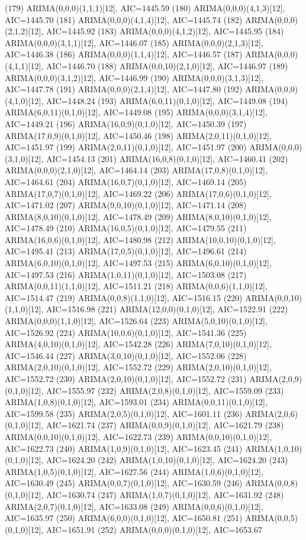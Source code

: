 \documentclass[12pt,letterpaper]{article}   %
\begin{document}
\begin{smallconsole}[caption={Modelos Ordenados por AIC}]
(179) ARIMA(0,0,0)(1,1,1)[12], AIC=1445.59
(180) ARIMA(0,0,0)(4,1,3)[12], AIC=1445.70
(181) ARIMA(0,0,0)(4,1,4)[12], AIC=1445.74
(182) ARIMA(0,0,0)(2,1,2)[12], AIC=1445.92
(183) ARIMA(0,0,0)(4,1,2)[12], AIC=1445.95
(184) ARIMA(0,0,0)(3,1,1)[12], AIC=1446.07
(185) ARIMA(0,0,0)(2,1,3)[12], AIC=1446.38
(186) ARIMA(0,0,0)(1,1,4)[12], AIC=1446.57
(187) ARIMA(0,0,0)(4,1,1)[12], AIC=1446.70
(188) ARIMA(0,0,10)(2,1,0)[12], AIC=1446.97
(189) ARIMA(0,0,0)(3,1,2)[12], AIC=1446.99
(190) ARIMA(0,0,0)(3,1,3)[12], AIC=1447.78
(191) ARIMA(0,0,0)(2,1,4)[12], AIC=1447.80
(192) ARIMA(0,0,0)(4,1,0)[12], AIC=1448.24
(193) ARIMA(6,0,11)(0,1,0)[12], AIC=1449.08
(194) ARIMA(6,0,11)(0,1,0)[12], AIC=1449.08
(195) ARIMA(0,0,0)(3,1,4)[12], AIC=1449.21
(196) ARIMA(16,0,9)(0,1,0)[12], AIC=1450.39
(197) ARIMA(17,0,9)(0,1,0)[12], AIC=1450.46
(198) ARIMA(2,0,11)(0,1,0)[12], AIC=1451.97
(199) ARIMA(2,0,11)(0,1,0)[12], AIC=1451.97
(200) ARIMA(0,0,0)(3,1,0)[12], AIC=1454.13
(201) ARIMA(16,0,8)(0,1,0)[12], AIC=1460.41
(202) ARIMA(0,0,0)(2,1,0)[12], AIC=1464.14
(203) ARIMA(17,0,8)(0,1,0)[12], AIC=1464.61
(204) ARIMA(16,0,7)(0,1,0)[12], AIC=1469.14
(205) ARIMA(17,0,7)(0,1,0)[12], AIC=1469.22
(206) ARIMA(17,0,6)(0,1,0)[12], AIC=1471.02
(207) ARIMA(9,0,10)(0,1,0)[12], AIC=1471.14
(208) ARIMA(8,0,10)(0,1,0)[12], AIC=1478.49
(209) ARIMA(8,0,10)(0,1,0)[12], AIC=1478.49
(210) ARIMA(16,0,5)(0,1,0)[12], AIC=1479.55
(211) ARIMA(16,0,6)(0,1,0)[12], AIC=1480.98
(212) ARIMA(10,0,10)(0,1,0)[12], AIC=1495.41
(213) ARIMA(17,0,5)(0,1,0)[12], AIC=1496.61
(214) ARIMA(6,0,10)(0,1,0)[12], AIC=1497.53
(215) ARIMA(6,0,10)(0,1,0)[12], AIC=1497.53
(216) ARIMA(1,0,11)(0,1,0)[12], AIC=1503.08
(217) ARIMA(0,0,11)(1,1,0)[12], AIC=1511.21
(218) ARIMA(0,0,6)(1,1,0)[12], AIC=1514.47
(219) ARIMA(0,0,8)(1,1,0)[12], AIC=1516.15
(220) ARIMA(0,0,10)(1,1,0)[12], AIC=1516.98
(221) ARIMA(12,0,0)(0,1,0)[12], AIC=1522.91
(222) ARIMA(0,0,0)(1,1,0)[12], AIC=1526.64
(223) ARIMA(5,0,10)(0,1,0)[12], AIC=1526.92
(224) ARIMA(10,0,6)(0,1,0)[12], AIC=1541.36
(225) ARIMA(4,0,10)(0,1,0)[12], AIC=1542.28
(226) ARIMA(7,0,10)(0,1,0)[12], AIC=1546.44
(227) ARIMA(3,0,10)(0,1,0)[12], AIC=1552.06
(228) ARIMA(2,0,10)(0,1,0)[12], AIC=1552.72
(229) ARIMA(2,0,10)(0,1,0)[12], AIC=1552.72
(230) ARIMA(2,0,10)(0,1,0)[12], AIC=1552.72
(231) ARIMA(2,0,9)(0,1,0)[12], AIC=1555.97
(232) ARIMA(2,0,8)(0,1,0)[12], AIC=1559.09
(233) ARIMA(1,0,8)(0,1,0)[12], AIC=1593.01
(234) ARIMA(0,0,11)(0,1,0)[12], AIC=1599.58
(235) ARIMA(2,0,5)(0,1,0)[12], AIC=1601.11
(236) ARIMA(2,0,6)(0,1,0)[12], AIC=1621.74
(237) ARIMA(0,0,9)(0,1,0)[12], AIC=1621.79
(238) ARIMA(0,0,10)(0,1,0)[12], AIC=1622.73
(239) ARIMA(0,0,10)(0,1,0)[12], AIC=1622.73
(240) ARIMA(1,0,9)(0,1,0)[12], AIC=1623.45
(241) ARIMA(1,0,10)(0,1,0)[12], AIC=1624.20
(242) ARIMA(1,0,10)(0,1,0)[12], AIC=1624.20
(243) ARIMA(1,0,5)(0,1,0)[12], AIC=1627.56
(244) ARIMA(1,0,6)(0,1,0)[12], AIC=1630.49
(245) ARIMA(0,0,7)(0,1,0)[12], AIC=1630.59
(246) ARIMA(0,0,8)(0,1,0)[12], AIC=1630.74
(247) ARIMA(1,0,7)(0,1,0)[12], AIC=1631.92
(248) ARIMA(2,0,7)(0,1,0)[12], AIC=1633.08
(249) ARIMA(0,0,6)(0,1,0)[12], AIC=1635.97
(250) ARIMA(6,0,0)(0,1,0)[12], AIC=1650.81
(251) ARIMA(0,0,5)(0,1,0)[12], AIC=1651.91
(252) ARIMA(0,0,0)(0,1,0)[12], AIC=1653.67
\end{smallconsole}
\end{document}
